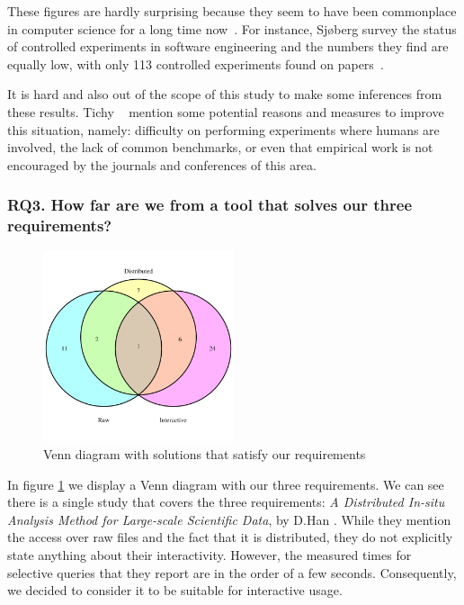 These figures are hardly surprising because they seem to have been commonplace
in computer science for a long time now~\cite{TICHY1995,ZELKOWITZ1997,Sjoberg2005}.
For instance, Sjøberg \etal survey the status of controlled experiments
in software engineering and the numbers they find are equally low, with
only 113 controlled experiments found on  papers~\cite{Sjoberg2005}.

It is hard and also out of the scope of this study to make some inferences from these
results. Tichy \etal~\cite{TICHY1995} mention some potential reasons and measures
to improve this situation, namely: difficulty on performing experiments where humans
are involved, the lack of common benchmarks, or even that empirical work is not
encouraged by the journals and conferences of this area.

\subsubsection{RQ3. How far are we from a tool that solves our three requirements?}

\begin{figure}[htbp]
    \centering
    \includegraphics[width=0.5\textwidth]{images/2_mapping/venn}
    \caption{Venn diagram with solutions that satisfy our requirements}
    \label{fig:mapping/venn_requirements}
\end{figure}

In figure \ref{fig:mapping/venn_requirements} we display a Venn diagram with our three
requirements. We can see there is a single study that covers the three requirements:
\textit{{A} {D}istributed {I}n-situ {A}nalysis {M}ethod for {L}arge-scale
{S}cientific {D}ata}, by D.Han \etal\cite{Han2017}. While they mention the
access over raw files and the fact that it is distributed, they do not
explicitly state anything about their interactivity. However, the measured times
for selective queries that they report are in the order of a few seconds. Consequently, we
decided to consider it to be suitable for interactive usage.

